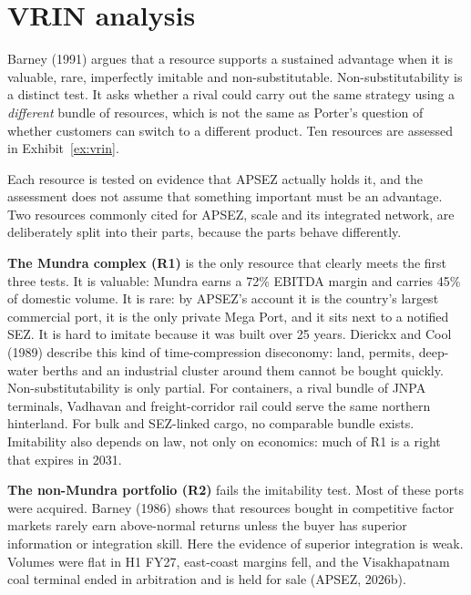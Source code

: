 \documentclass[12pt, a4paper]{article}
\begin{document}
\section{VRIN analysis}\label{sec:vrin}
Barney (1991) argues that a resource supports a sustained advantage when it is
valuable, rare, imperfectly imitable and non-substitutable.
Non-substitutability is a distinct test. It asks whether a rival could carry
out the same strategy using a \emph{different} bundle of resources, which is not
the same as Porter's question of whether customers can switch to a different
product. Ten resources are assessed in Exhibit~\ref{ex:vrin}.

Each resource is tested on evidence that APSEZ actually holds it, and the
assessment does not assume that something important must be an advantage. Two
resources commonly cited for APSEZ, scale and its integrated network, are
deliberately split into their parts, because the parts behave differently.

\textbf{The Mundra complex (R1)} is the only resource that clearly meets the
first three tests. It is valuable: Mundra earns a 72\% EBITDA margin and carries
45\% of domestic volume. It is rare: by APSEZ's account it is the country's
largest commercial port, it is the only private Mega Port, and it sits next to
a notified SEZ. It is hard to imitate because it was built over 25 years.
Dierickx and Cool (1989) describe this kind of time-compression diseconomy:
land, permits, deep-water berths and an industrial cluster around them cannot
be bought quickly. Non-substitutability is only partial. For containers, a
rival bundle of JNPA terminals, Vadhavan and freight-corridor rail could serve
the same northern hinterland. For bulk and SEZ-linked cargo, no comparable
bundle exists. Imitability also depends on law, not only on economics: much of
R1 is a right that expires in 2031.

\textbf{The non-Mundra portfolio (R2)} fails the imitability test. Most of
these ports were acquired. Barney (1986) shows that resources bought in
competitive factor markets rarely earn above-normal returns unless the buyer
has superior information or integration skill. Here the evidence of superior
integration is weak. Volumes were flat in H1 FY27, east-coast margins fell, and
the Visakhapatnam coal terminal ended in arbitration and is held for sale
(APSEZ, 2026b).
\end{document}

